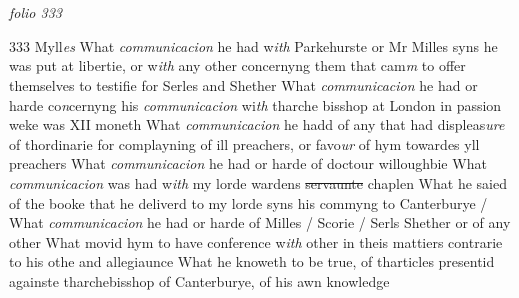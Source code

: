 \documentclass[12pt, a4paper]{book}
\begin{document}
\dotfill
					  \section*{}  \subsection*{}

\textit{folio 333}



{\color{Mahogany}333} Myll\textit{es}  
				\marginpar[\vspace{0.5cm}{\textcolor{Gray}{1}}]{}
			 What \textit{communicacion} he had w\textit{ith} Parkehurste or Mr Milles syns he was put at libertie, or w\textit{ith} any other concernyng them that cam\textit{m} to offer themselves to testifie for Serles and Shether  
				\marginpar[\vspace{0.5cm}{\textcolor{Gray}{2}}]{}
			 What \textit{communicacion} he had or harde co\textit{n}cernyng his \textit{communicacion} wi\textit{th }tharche bisshop at London in passion weke was XII moneth  
				\marginpar[\vspace{0.5cm}{\textcolor{Gray}{3}}]{}
			 What \textit{communicacion} he hadd of any that had displeas\textit{ure} of thordinarie  for complayning of ill preachers, or favo\textit{ur} of hym towardes  yll preachers  
				\marginpar[\vspace{0.5cm}{\textcolor{Gray}{4}}]{}
			 What \textit{communicacion} he had or harde of doctour willoughbie  
				\marginpar[\vspace{0.5cm}{\textcolor{Gray}{5}}]{}
			 What \textit{communicacion} was had w\textit{ith} my lorde wardens \sout{servaunte }chaplen  
				\marginpar[\vspace{0.5cm}{\textcolor{Gray}{6}}]{}
			 What he saied of the booke that he deliverd to my lorde syns his commyng to Canterburye /  
				\marginpar[\vspace{0.5cm}{\textcolor{Gray}{7}}]{}
			 What \textit{communicacion} he had or harde of Milles / Scorie / Serls Shether or of any other  
				\marginpar[\vspace{0.5cm}{\textcolor{Gray}{8}}]{}
			 What movid hym to have conference w\textit{ith} other in theis mattiers contrarie to his othe and allegiaunce  
				\marginpar[\vspace{0.5cm}{\textcolor{Gray}{9}}]{}
			 What he knoweth to be true, of tharticles presentid againste tharchebisshop of Canterburye, of his awn knowledge  
\end{document}
